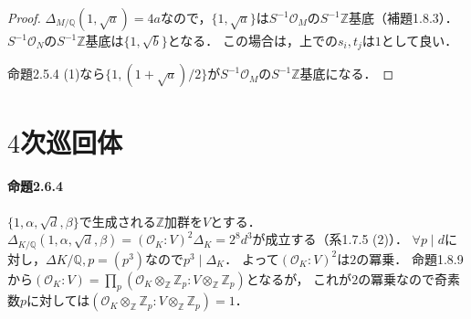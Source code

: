 \begin{proof}
  $\varDelta_{M/\mathbb{Q}}(1, \sqrt{a})=4a$なので，$\{1, \sqrt{a}\}$は$S^{-1}\mathcal{O}_M$の$S^{-1}\mathbb{Z}$基底（補題1.8.3）．
  $S^{-1}\mathcal{O}_N$の$S^{-1}\mathbb{Z}$基底は$\{1, \sqrt{b}\}$となる．
  この場合は，上での$s_i, t_j$は$1$として良い．

  命題2.5.4 (1)なら$\{1, (1+\sqrt{a})/2\}$が$S^{-1}\mathcal{O}_M$の$S^{-1}\mathbb{Z}$基底になる．
\end{proof}

\section{$4$次巡回体}
\paragraph{命題2.6.4}
$\{1, \alpha, \sqrt{d}, \beta\}$で生成される$\mathbb{Z}$加群を$V$とする．
$\varDelta_{K/\mathbb{Q}}(1, \alpha, \sqrt{d}, \beta)=(\mathcal{O}_K:V)^2\varDelta_K=2^8d^3$が成立する（系1.7.5 (2)）．
$\forall p\mid d$に対し，$\varDelta{K/\mathbb{Q}, p}=(p^3)$なので$p^3\mid\varDelta_K$．
よって$(\mathcal{O}_K:V)^2$は$2$の冪乗．
命題1.8.9から$(\mathcal{O}_K:V)=\prod_p(\mathcal{O}_K\otimes_\mathbb{Z}\mathbb{Z}_p:V\otimes_\mathbb{Z}\mathbb{Z}_p)$となるが，
これが$2$の冪乗なので奇素数$p$に対しては$(\mathcal{O}_K\otimes_\mathbb{Z}\mathbb{Z}_p:V\otimes_\mathbb{Z}\mathbb{Z}_p)=1$．
